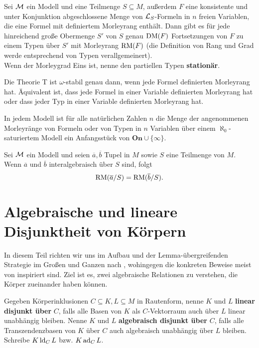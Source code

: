 	\begin{fact}\label{stationär}
		Sei $\mathcal{M}$ ein Modell und eine Teilmenge $S\subseteq M$, außerdem $F$ eine konsistente und unter Konjunktion abgeschlossene Menge von $\mathcal{L}_S$-Formeln in $n$ freien Variablen, die eine Formel mit definiertem Morleyrang enthält. Dann gibt es für jede hinreichend große Obermenge $S'$ von $S$ genau $\operatorname{DM}(F)$ Fortsetzungen von $F$ zu einem Typen über $S'$ mit Morleyrang $\operatorname{RM}(F)$ (die Definition von Rang und Grad werde entsprechend von Typen verallgemeinert).\\
		Wenn der Morleygrad Eins ist, nenne den partiellen Typen \textbf{stationär}. 
	\end{fact}
	
	\begin{fact}\label{Stabilität Morleyrang}
		Die Theorie T ist $\omega$-stabil genau dann, wenn jede Formel definierten Morleyrang hat. Äquivalent ist, dass jede Formel in einer Variable definierten Morleyrang hat oder dass jeder Typ in einer Variable definierten Morleyrang hat.
	\end{fact}
	
	\begin{fact}\label{Anfangsstück}
		In jedem Modell ist für alle natürlichen Zahlen $n$ die Menge der angenommenen Morleyränge von Formeln oder von Typen in $n$ Variablen über einem $\aleph_0$-saturiertem Modell ein Anfangsstück von $\textbf{On}\cup\{\infty\}$.
	\end{fact}
	
	\begin{fact}
		Sei $\mathcal{M}$ ein Modell und seien $\overline{a},\overline{b}$ Tupel in $M$ sowie $S$ eine Teilmenge von $M$. Wenn $\overline{a}$ und $\overline{b}$ interalgebraisch über $S$ sind, folgt $$\operatorname{RM}(\overline{a}/S)=\operatorname{RM}(\overline{b}/S).$$
	\end{fact}
	
	\section{Algebraische und lineare Disjunktheit von Körpern}
	In diesem Teil richten wir uns im Aufbau und der Lemma-übergreifenden Strategie im Großen und Ganzen nach \cite{Delon}, wohingegen die konkreten Beweise meist von \cite{SergeLang} inspiriert sind. Ziel ist es, zwei algebraische Relationen zu verstehen, die Körper zueinander haben können.
	
    \begin{definition}
    	Gegeben Körperinklusionen $C\subseteq K,L\subseteq M$ in Rautenform, nenne $K$ und $L$ \textbf{linear disjunkt über} $C$, falls alle Basen von $K$ als $C$-Vektorraum auch über $L$ linear unabhängig bleiben. Nenne $K$ und $L$ \textbf{algebraisch disjunkt über} $C$, falls alle Transzendenzbasen von $K$ über $C$ auch algebraisch unabhängig über $L$ bleiben. Schreibe $K\operatorname{ld}_CL$ bzw. $K\operatorname{ad}_CL$.
    \end{definition}
    
